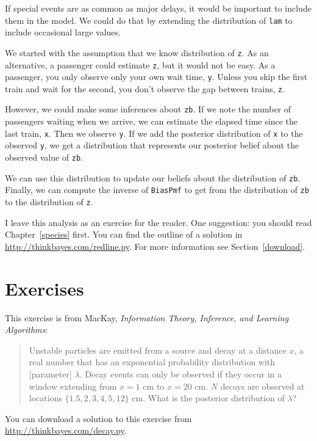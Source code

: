 \documentclass[12pt]{book}
\begin{document}
If special events are as common as major delays, it would
be important to include them in the model.  We could do that by
extending the distribution of {\tt lam} to include occasional
large values.

We started with the assumption that we know
distribution of {\tt z}.
As an alternative, a passenger could estimate {\tt z}, but it would
not be easy.
As a passenger, you only
observe only your own wait time, {\tt y}.  Unless you skip
the first train and wait for the second, you don't
observe the gap between trains, {\tt z}.

However, we could make some inferences about {\tt zb}.  If we note
the number of passengers waiting when we arrive, we can estimate
the elapsed time since the last train, {\tt x}.  Then we observe
{\tt y}.  If we add the posterior distribution of {\tt x} to
the observed {\tt y}, we get a distribution that represents
our posterior belief about the observed value of {\tt zb}.

We can use this distribution to update our beliefs about the
distribution of {\tt zb}.  Finally, we can compute the
inverse of {\tt BiasPmf} to get from the distribution of {\tt zb}
to the distribution of {\tt z}.

I leave this analysis as an exercise for the
reader.  One suggestion: you should read Chapter~\ref{species} first.
You can find the outline of
a solution in \url{http://thinkbayes.com/redline.py}.
  For more information
see Section~\ref{download}.

\section{Exercises}

\begin{exercise}
This exercise is from
MacKay, {\em Information Theory, Inference, and Learning Algorithms}:

\begin{quote}
    Unstable particles are emitted from a source and decay at a
distance $x$, a real number that has an exponential probability
distribution with [parameter] $\lambda$.  Decay events can only be
observed if they occur in a window extending from $x=1$ cm to $x=20$
cm.  $N$ decays are observed at locations $\{ 1.5, 2, 3, 4, 5, 12 \}$
cm.  What is the posterior distribution of $\lambda$?

\end{quote}

You can download a solution to this exercise from
\url{http://thinkbayes.com/decay.py}.

\end{exercise}
\end{document}
